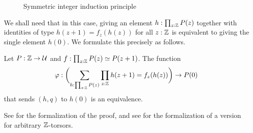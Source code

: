 \documentclass[a4paper,12pt]{amsart}
\begin{document}
\begin{figure}[b]
  \centering
  \caption{Symmetric integer induction principle}
  \label{fig:integers-induction-symmetric}
\end{figure}

We shall need that in this case, giving an element $h:\prod_{z:\mathbb{Z}}P(z)$
together with identities of type $h(z+1) = f_z(h(z))$ for all $z:\mathbb{Z}$
is equivalent to giving the single element $h(0)$.
We formulate this precisely as follows.

\begin{theorem}\label{thm:integers-univ-symm}
  Let $P : \mathbb{Z} \to \mathcal{U}$ and $f : \prod_{z:\mathbb{Z}}P(z) \simeq P(z+1)$. The function
  \[
    \varphi : \biggl(\sum_{h:\prod_{z:\mathbb{Z}}P(z)}\prod_{z:\mathbb{Z}}h(z+1) = f_z(h(z))\biggr) \to P(0)
  \]
  that sends $(h,q)$ to $h(0)$ is an equivalence.
\end{theorem}

See \cite[\href{https://github.com/UniMath/UniMath/blob/c856a5/UniMath/SyntheticHomotopyTheory/AffineLine.v\#L167}{AffineLine.v, commit c856a5, line 167}]{UniMath}
for the formalization of the proof, and
see \cite[\href{https://github.com/UniMath/UniMath/blob/c856a5/UniMath/SyntheticHomotopyTheory/AffineLine.v\#L242}{AffineLine.v, commit c856a5, line 242}]{UniMath}
for the formalization of a version for arbitrary $\mathbb{Z}$-torsors.
\end{document}
